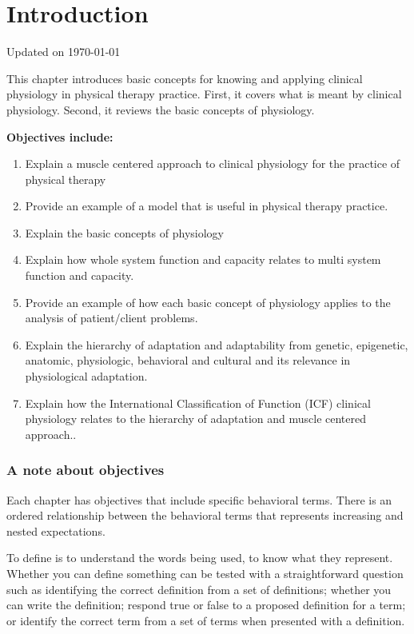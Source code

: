 \chapter{Introduction}\label{chp:introduction}
Updated on \today
\minitoc

This chapter introduces basic concepts for knowing and applying clinical physiology in physical therapy practice. First, it covers what is meant by clinical physiology. Second, it reviews the basic concepts of physiology. 

\vspace{5mm}

\textbf{Objectives include:}
\begin{enumerate}
    \item Explain a muscle centered approach to clinical physiology for the practice of physical therapy
    \item Provide an example of a model that is useful in physical therapy practice.
    \item Explain the basic concepts of physiology
    \item Explain how whole system function and capacity relates to multi system function and capacity. 
    \item Provide an example of how each basic concept of physiology applies to the analysis of patient/client problems.
    \item Explain the hierarchy of adaptation and adaptability from genetic, epigenetic, anatomic, physiologic, behavioral and cultural and its relevance in physiological adaptation.
    \item Explain how the International Classification of Function (ICF) clinical physiology relates to the hierarchy of adaptation and muscle centered approach..
\end{enumerate}

\subsection{A note about objectives}

Each chapter has objectives that include specific behavioral terms. There is an ordered relationship between the behavioral terms that represents increasing and nested expectations. 

To define is to understand the words being used, to know what they represent. Whether you can define something can be tested with a straightforward question such as identifying the correct definition from a set of definitions; whether you can write the definition; respond true or false to a proposed definition for a term; or identify the correct term from a set of terms when presented with a definition. 

